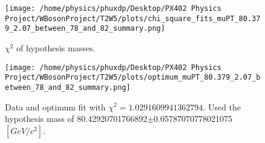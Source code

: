 \documentclass[12pt]{article}
\begin{document}
       \begin{figure}[tb]
		\centering
		\texttt{[image: /home/physics/phuxdp/Desktop/PX402 Physics Project/WBosonProject/T2W5/plots/chi\_square\_fits\_muPT\_80.379\_2.07\_between\_78\_and\_82\_summary.png]}
		\caption{\small $\chi^2$ of hypothesis masses. }
		\label{fig: fig_chi_square}
	\end{figure}

    \begin{figure}[tb]
		\centering
		\texttt{[image: /home/physics/phuxdp/Desktop/PX402 Physics Project/WBosonProject/T2W5/plots/optimum\_muPT\_80.379\_2.07\_between\_78\_and\_82\_summary.png]}
		\caption{\small Data and optimum fit with $\chi^2 = 1.0291609941362794$. Used the hypothesis mass of 80.42920701766892$\pm$0.05787070778021075 $[GeV/c^{2}]$. }
		\label{fig: fig_optim_parms}
	\end{figure}
    
\end{document}
